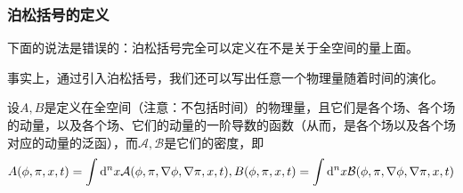\documentclass[UTF8, a4paper]{ctexart}
\begin{document}
\subsubsection{泊松括号的定义}

下面的说法是错误的：泊松括号完全可以定义在不是关于全空间的量上面。

事实上，通过引入泊松括号，我们还可以写出任意一个物理量随着时间的演化。

设$A, B$是定义在全空间（注意：不包括时间）的物理量，且它们是各个场、各个场的动量，以及各个场、它们的动量的一阶导数的函数（从而，是各个场以及各个场对应的动量的泛函），而$\mathcal{A}, \mathcal{B}$是它们的密度，即
\begin{equation}
    A(\phi, \pi, x, t) = \int \mathrm{d}^n x \mathcal{A}(\phi, \pi, \nabla \phi, \nabla \pi, x, t), \\
    B(\phi, \pi, x, t) = \int \mathrm{d}^n x \mathcal{B}(\phi, \pi, \nabla \phi, \nabla \pi, x, t)
\end{equation}
\end{document}
